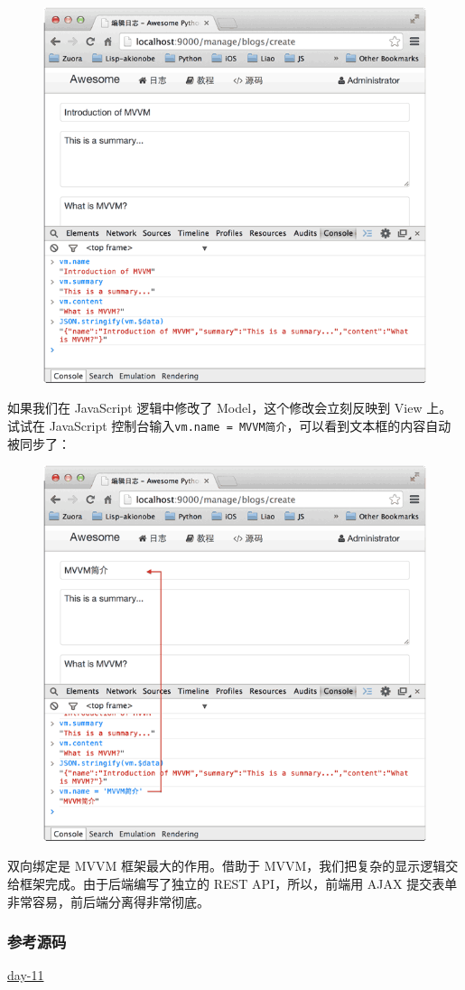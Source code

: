  
 \begin{figure}[htp]
	\centering
	\includegraphics[width=0.6\linewidth]{fig/956056345770752.png}
\end{figure}


如果我们在 JavaScript 逻辑中修改了 Model，这个修改会立刻反映到 View
上。试试在 JavaScript
控制台输入\texttt{vm.name\ =\ \textquotesingle{}MVVM简介\textquotesingle{}}，可以看到文本框的内容自动被同步了：

 
 \begin{figure}[htp]
	\centering
	\includegraphics[width=0.6\linewidth]{fig/956056362546592.png}
\end{figure}


双向绑定是 MVVM 框架最大的作用。借助于
MVVM，我们把复杂的显示逻辑交给框架完成。由于后端编写了独立的 REST
API，所以，前端用 AJAX 提交表单非常容易，前后端分离得非常彻底。

\hypertarget{ux53c2ux8003ux6e90ux7801}{%
\subsubsection{参考源码}\label{ux53c2ux8003ux6e90ux7801}}

\href{https://github.com/michaelliao/awesome-python3-webapp/tree/day-11}{day-11}


